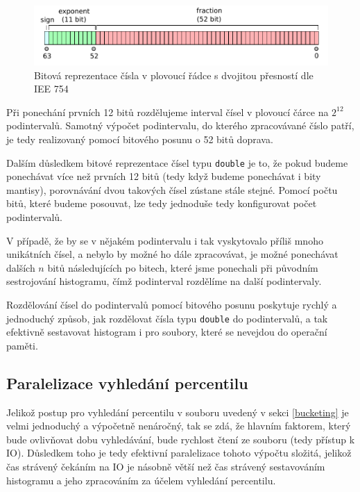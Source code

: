 \documentclass[12pt, a4paper]{article}
\begin{document}
\begin{figure}[!ht]
    \centering 
    \includegraphics[width=1\textwidth]{pdf/double.pdf}
    \caption{Bitová reprezentace čísla v plovoucí řádce s dvojitou přesností dle IEE 754}
\end{figure}

Při ponechání prvních 12 bitů rozdělujeme interval čísel v plovoucí čárce na $2^{12}$ podintervalů.
Samotný výpočet podintervalu, do kterého zpracovávané číslo patří, je tedy realizovaný pomocí bitového posunu o 52 bitů doprava.

Dalším důsledkem bitové reprezentace čísel typu \texttt{double} je to, že pokud budeme ponechávat více než prvních 12 bitů (tedy když budeme ponechávat i bity mantisy), porovnávání dvou takových čísel zústane stále stejné.
Pomocí počtu bitů, které budeme posouvat, lze tedy jednoduše tedy konfigurovat počet podintervalů.

V případě, že by se v nějakém podintervalu i tak vyskytovalo příliš mnoho unikátních čísel, a nebylo by možné ho dále zpracovávat, je možné ponechávat dalších $n$ bitů následujících po bitech, které jsme ponechali při původním sestrojování histogramu, čímž podinterval rozdělíme na další podintervaly.

Rozdělování čísel do podintervalů pomocí bitového posunu poskytuje rychlý a jednoduchý způsob, jak rozdělovat čísla typu \texttt{double} do podintervalů, a tak efektivně sestavovat histogram i pro soubory, které se nevejdou do operační paměti.

\subsection{Paralelizace vyhledání percentilu}\label{parallel-bucketing}
Jelikož postup pro vyhledání percentilu v souboru uvedený v sekci \ref{bucketing} je velmi jednoduchý a výpočetně nenáročný, tak se zdá, že hlavním faktorem, který bude ovlivňovat dobu vyhledávání, bude rychlost čtení ze souboru (tedy přístup k IO).
Důsledkem toho je tedy efektivní paralelizace tohoto výpočtu složitá, jelikož čas strávený čekáním na IO je násobně větší než čas strávený sestavováním histogramu a jeho zpracováním za účelem vyhledání percentilu.
\end{document}
